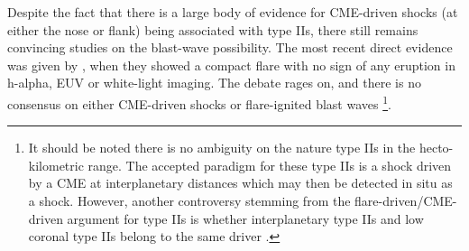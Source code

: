 Despite the fact that there is a large body of evidence for CME-driven shocks (at either the nose or flank) being associated with type IIs, there still remains convincing studies on the blast-wave possibility. The most recent direct evidence was given by \citep{mag2012}, when they showed a compact flare with no sign of any eruption in h-alpha, EUV or white-light imaging. The debate rages on, and there is no consensus on either CME-driven shocks or flare-ignited blast waves \citep{vrsnak2008} \footnote{It should be noted there is no ambiguity on the nature type IIs in the hecto-kilometric range. The accepted paradigm for these type IIs is a shock driven by a CME at interplanetary distances which may then be detected in situ as a shock. However, another controversy stemming from the flare-driven/CME-driven argument for type IIs is whether interplanetary type IIs and low coronal type IIs belong to the same driver \citep{cane2005}.}.



